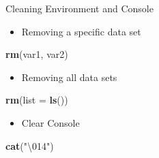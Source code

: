 \documentclass[ignorenonframetext,]{beamer}
\newenvironment{Shaded}{\begin{snugshade}}{\end{snugshade}}
\newcommand{\CharTok}[1]{\textcolor[rgb]{0.31,0.60,0.02}{#1}}
\newcommand{\DataTypeTok}[1]{\textcolor[rgb]{0.13,0.29,0.53}{#1}}
\newcommand{\KeywordTok}[1]{\textcolor[rgb]{0.13,0.29,0.53}{\textbf{#1}}}
\newcommand{\NormalTok}[1]{#1}
\newcommand{\StringTok}[1]{\textcolor[rgb]{0.31,0.60,0.02}{#1}}
\providecommand{\tightlist}{%
  \setlength{\itemsep}{0pt}\setlength{\parskip}{0pt}}
\begin{document}
\begin{frame}[fragile]{Cleaning Environment and Console}
\protect\hypertarget{cleaning-environment-and-console}{}

\begin{itemize}
\tightlist
\item
  Removing a specific data set
\end{itemize}

\begin{Shaded}
\begin{Highlighting}[]
\KeywordTok{rm}\NormalTok{(var1, var2)}
\end{Highlighting}
\end{Shaded}

\begin{itemize}
\tightlist
\item
  Removing all data sets
\end{itemize}

\begin{Shaded}
\begin{Highlighting}[]
\KeywordTok{rm}\NormalTok{(}\DataTypeTok{list =} \KeywordTok{ls}\NormalTok{())}
\end{Highlighting}
\end{Shaded}

\begin{itemize}
\tightlist
\item
  Clear Console
\end{itemize}

\begin{Shaded}
\begin{Highlighting}[]
\KeywordTok{cat}\NormalTok{(}\StringTok{"}\CharTok{\textbackslash{}014}\StringTok{"}\NormalTok{)}
\end{Highlighting}
\end{Shaded}

\end{frame}
\end{document}
